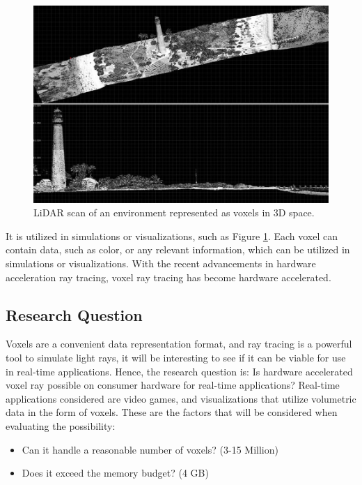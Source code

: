 \documentclass[12pt]{article}
\begin{document}
\begin{figure}[H]
    \begin{center}
        \includegraphics[scale=0.4]{LiDAR}
    \end{center}
    \caption{LiDAR scan of an environment represented as voxels in 3D space. \parencite{NOS:LiDAR}}
    \label{fig:LiDAR}
\end{figure}

It is utilized in simulations or visualizations, such as Figure \ref{fig:LiDAR}.
Each voxel can contain data, such as color, or any relevant information,
which can be utilized in simulations or visualizations. With the recent advancements in hardware acceleration
ray tracing, voxel ray tracing has become hardware accelerated. \parencite[Chapter~37]{NVIDIA:RTGems2}

\subsection{Research Question}

Voxels are a convenient data representation format, and ray tracing is a powerful tool to simulate light rays,
it will be interesting to see if it can be viable for use in real-time applications.
Hence, the research question is: Is hardware accelerated voxel ray possible on consumer hardware for real-time applications?
Real-time applications considered are video games, and visualizations that utilize volumetric data in the form of voxels.
These are the factors that will be considered when evaluating the possibility:
\begin{itemize}
    \itemsep0em
    \item Can it handle a reasonable number of voxels? (3-15 Million)
    \item Does it exceed the memory budget? (4 GB)
\end{itemize}
\end{document}
